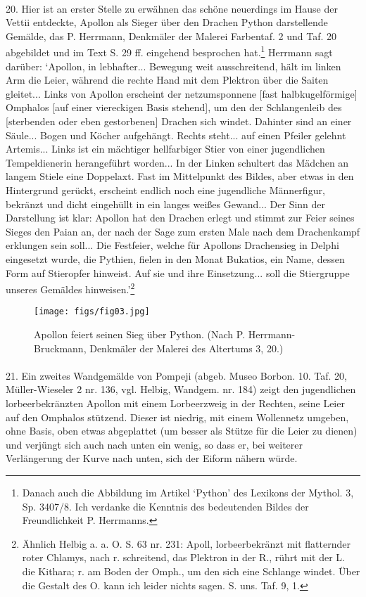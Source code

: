 \documentclass[a4paper, 11pt, oneside]{article}
\begin{document}
\paragraph{}
20. Hier ist an erster Stelle zu erwähnen das schöne neuerdings im Hause der Vettii entdeckte, Apollon als Sieger über den Drachen Python darstellende Gemälde, das P. Herrmann, Denkmäler der Malerei Farbentaf. 2 und Taf. 20 abgebildet und im Text S. 29 ff. eingehend besprochen hat.\footnote{Danach auch die Abbildung im Artikel `Python' des Lexikons der Mythol. 3, Sp. 3407/8. Ich verdanke die Kenntnis des bedeutenden Bildes der Freundlichkeit P. Herrmanns.} Herrmann sagt darüber: `Apollon, in lebhafter... Bewegung weit ausschreitend, hält im linken Arm die Leier, während die rechte Hand mit dem Plektron über die Saiten gleitet... Links von Apollon erscheint der netzumsponnene [fast halbkugelförmige] Omphalos [auf einer viereckigen Basis stehend], um den der Schlangenleib des [sterbenden oder eben gestorbenen] Drachen sich windet. Dahinter sind an einer Säule... Bogen und Köcher aufgehängt. Rechts steht... auf einen Pfeiler gelehnt Artemis... Links ist ein mächtiger hellfarbiger Stier von einer jugendlichen Tempeldienerin herangeführt worden... In der Linken schultert das Mädchen an langem Stiele eine Doppelaxt. Fast im Mittelpunkt des Bildes, aber etwas in den Hintergrund gerückt, erscheint endlich noch eine jugendliche Männerfigur, bekränzt und dicht eingehüllt in ein langes weißes Gewand... Der Sinn der Darstellung ist klar: Apollon hat den Drachen erlegt und stimmt zur Feier seines Sieges den Paian an, der nach der Sage zum ersten Male nach dem Drachenkampf erklungen sein soll... Die Festfeier, welche für Apollons Drachensieg in Delphi eingesetzt wurde, die Pythien, fielen in den Monat Bukatios, ein Name, dessen Form auf Stieropfer hinweist. Auf sie und ihre Einsetzung... soll die Stiergruppe unseres Gemäldes hinweisen.'\footnote{Ähnlich Helbig a. a. O. S. 63 nr. 231: Apoll, lorbeerbekränzt mit flatternder roter Chlamys, nach r. schreitend, das Plektron in der R., rührt mit der L. die Kithara; r. am Boden der Omph., um den sich eine Schlange windet. Über die Gestalt des O. kann ich leider nichts sagen. S. uns. Taf. 9, 1.}

\begin{figure}[H]
\centering
\texttt{[image: figs/fig03.jpg]}
\caption*{Apollon feiert seinen Sieg über Python. (Nach P. Herrmann-Bruckmann, Denkmäler der Malerei des Altertums 3, 20.)}
\end{figure}
\paragraph{}
21. Ein zweites Wandgemälde von Pompeji (abgeb. Museo Borbon. 10. Taf. 20, Müller-Wieseler 2 nr. 136, vgl. Helbig, Wandgem. nr. 184) zeigt den jugendlichen lorbeerbekränzten Apollon mit einem Lorbeerzweig in der Rechten, seine Leier auf den Omphalos stützend. Dieser ist niedrig, mit einem Wollennetz umgeben, ohne Basis, oben etwas abgeplattet (um besser als Stütze für die Leier zu dienen) und verjüngt sich auch nach unten ein wenig, so dass er, bei weiterer Verlängerung der Kurve nach unten, sich der Eiform nähern würde.
\end{document}
